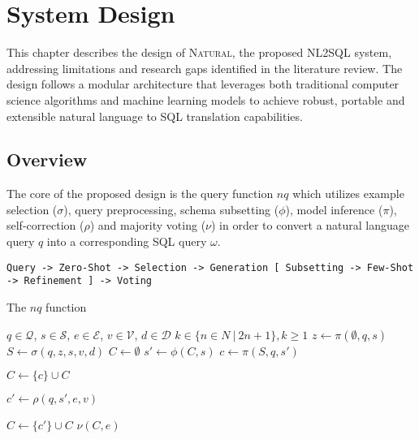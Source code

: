 \section{System Design}

This chapter describes the design of \textsc{Natural}, the proposed NL2SQL system, 
addressing limitations and research gaps identified in the literature review.
The design follows a modular architecture that leverages both traditional computer
science algorithms and machine learning models to achieve robust, portable and
extensible natural language to SQL translation capabilities.

\subsection{Overview}

The core of the proposed design is the query function $nq$ which utilizes
example selection ($\sigma$), query preprocessing, schema subsetting ($\phi$),
model inference ($\pi$), self-correction ($\rho$) and majority voting ($\nu$)
in order to convert a natural language query $q$ into a corresponding SQL query $\omega$.

\begin{verbatim}
Query -> Zero-Shot -> Selection -> Generation [ Subsetting -> Few-Shot -> Refinement ] -> Voting
\end{verbatim}

\begin{algorithm}

\caption{The $nq$ function}\label{alg:cap}

\begin{algorithmic}[1]
\Require $q \in \mathcal{Q}$, $s \in \mathcal{S}$, $e \in \mathcal{E}$, $v \in \mathcal{V}$, $d \in \mathcal{D}$
\Require $k \in \{ n \in N\ |\ 2n + 1 \}, k \geq 1$
\State $z \gets \pi(\emptyset,q, s)$       
\State $S \gets \sigma(q,z,s,v,d)$         
\State $C \gets \emptyset$                 
                          
    \State $s' \gets \phi(C, s)$           
    \State $c \gets \pi(S, q, s')$         

                               
        \State $C \gets \{c\} \cup C$      
    \EndIf

    \State $c' \gets \rho(q, s', e, v)$  

                              
        \State $C \gets \{c'\} \cup C$    
    \EndIf
\EndWhile
\State \Return $\nu(C, e)$               
\end{algorithmic}

\end{algorithm}


